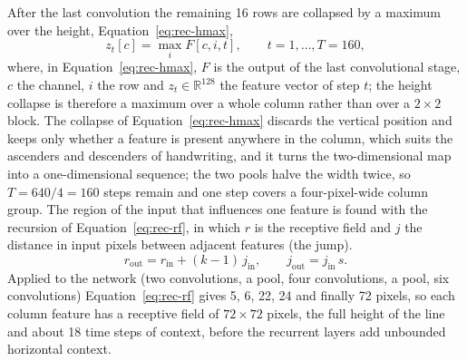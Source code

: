 After the last convolution the remaining 16 rows are collapsed by a maximum over the height, Equation~\ref{eq:rec-hmax},
\begin{equation}
z_t[c]=\max_{i}F[c,i,t],\qquad t=1,\ldots,T=160,
\label{eq:rec-hmax}
\end{equation}
where, in Equation~\ref{eq:rec-hmax}, $F$ is the output of the last convolutional stage, $c$ the channel, $i$ the row and $z_t\in\mathbb R^{128}$ the feature vector of step $t$; the height collapse is therefore a maximum over a whole column rather than over a $2\times2$ block.
The collapse of Equation~\ref{eq:rec-hmax} discards the vertical position and keeps only whether a feature is present anywhere in the column, which suits the ascenders and descenders of handwriting, and it turns the two-dimensional map into a one-dimensional sequence; the two pools halve the width twice, so $T=640/4=160$ steps remain and one step covers a four-pixel-wide column group.
The region of the input that influences one feature is found with the recursion of Equation~\ref{eq:rec-rf}, in which $r$ is the receptive field and $j$ the distance in input pixels between adjacent features (the jump).
\begin{equation}
r_{\mathrm{out}}=r_{\mathrm{in}}+(k-1)\,j_{\mathrm{in}},\qquad j_{\mathrm{out}}=j_{\mathrm{in}}\,s.
\label{eq:rec-rf}
\end{equation}
Applied to the network (two convolutions, a pool, four convolutions, a pool, six convolutions) Equation~\ref{eq:rec-rf} gives 5, 6, 22, 24 and finally 72 pixels, so each column feature has a receptive field of $72\times72$ pixels, the full height of the line and about 18 time steps of context, before the recurrent layers add unbounded horizontal context.

